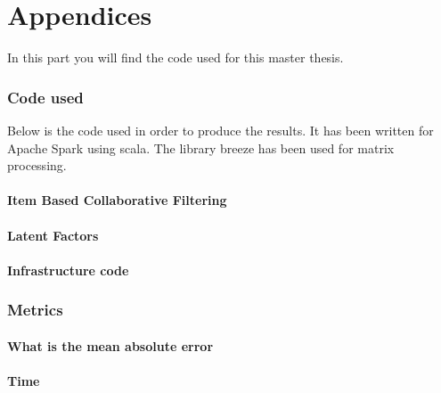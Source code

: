 \appendix
\part{Appendices}
In this part you will find the code used for this master thesis.
\section{Code used}
Below is the code used in order to produce the results. It has been 
written for Apache Spark \cite{ApacheSpark:1} using scala. The library breeze has been used for matrix processing.
\subsection{Item Based Collaborative Filtering}

\subsection{Latent Factors}

\subsection{Infrastructure code}


\section{Metrics}
\subsection{What is the mean absolute error}
\subsection{Time}
\listoftables
\newpage
\listoffigures